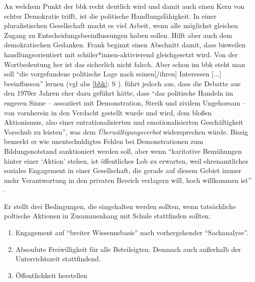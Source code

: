 An welchem Punkt der \gls{bbk} recht deutlich wird und damit auch einen Kern von echter Demokratie trifft, ist die politische Handlungsfähigkeit. In einer pluralistischen Gesellschaft macht es viel Arbeit, wenn alle möglichst gleichen Zugang zu Entscheidungsbeeinflussungen haben sollen. Hilft aber auch dem demokratischen Gedanken. 
Frank \textcite[466]{Nonnenmacher2010} beginnt einen Abschnitt damit, dass bisweilen handlungsorientiert mit schüler*innen-aktivierend gleichgesetzt wird. Von der Wortbedeutung her ist das sicherlich nicht falsch. Aber schon im \gls{bbk} steht man soll \enquote{die vorgefundene politische Lage nach seinen[/ihren] Interessen [...] beeinflussen} lernen (\gls{vgl} \gls{abs} \ref{bbk}: \gls{S} \pageref{bbk}). \textcite[466-467]{Nonnenmacher2010} führt jedoch aus, dass die Debatte aus den 1970er Jahren eher dazu geführt hätte, dass \enquote{das politische Handeln im engeren Sinne -- assoziiert mit Demonstration, Streik und zivilem Ungehorsam -- von vornherein in den Verdacht gestellt wurde und wird, dem bloßen Aktionismus, also einer entrationalisierten und emotionalisierten Geschäftigkeit Vorschub zu leisten}, was dem \emph{Überwältigungsverbot} widersprechen würde.
Bissig bemerkt er wie unentschuldigtes Fehlen bei Demonstrationen zum Bildungsnotstand sanktioniert werden soll, aber wenn \enquote{karitative Bemühungen hinter einer \enquote{Aktion} stehen, ist öffentliches Lob zu erwarten, weil ehrenamtliches soziales Engagement in einer Gesellschaft, die gerade auf diesem Gebiet immer mehr Verantwortung in den privaten Bereich verlagern will, hoch willkommen ist} \autocite[467]{Nonnenmacher2010}.


Er stellt drei Bedingungen, die eingehalten werden sollten, wenn tatsächliche poltische Aktionen in Zusammenhang mit Schule stattfinden sollten:
\begin{enumerate}
    \item Engagement auf \enquote{breiter Wissennsbasis} nach vorhergehender \enquote{Sachanalyse}.
    \item Absoulute Freiwilligkeit für alle Beteileigten. Demnach auch außerhalb der Unterrichtszeit stattfindend.
    \item Öffentlichkeit herstellen %
    
    \autocite[467]{Nonnenmacher2010}
\end{enumerate}


